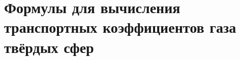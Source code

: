 
\chapter{Формулы для вычисления транспортных коэффициентов газа твёрдых сфер} \label{app:gammas}



